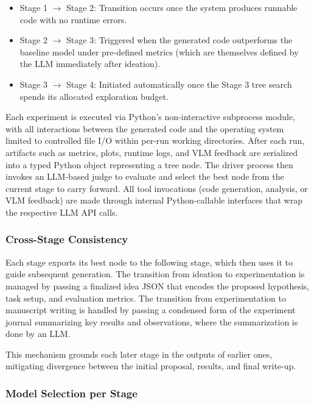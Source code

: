 \begin{appendices}
\begin{itemize}

\item{Stage 1 $\rightarrow$ Stage 2: Transition occurs once the system produces runnable code with no runtime errors.}

\item{Stage 2 $\rightarrow$ Stage 3: Triggered when the generated code outperforms the baseline model under pre-defined metrics (which are themselves defined by the LLM immediately after ideation).}

\item{Stage 3 $\rightarrow$ Stage 4: Initiated automatically once the Stage 3 tree search spends its allocated exploration budget.}

\end{itemize}

Each experiment is executed via Python's non-interactive subprocess module, with all interactions between the generated code and the operating system limited to controlled file I/O within per-run working directories.
After each run, artifacts such as metrics, plots, runtime logs, and VLM feedback are serialized into a typed Python object representing a tree node.
The driver process then invokes an LLM-based judge to evaluate and select the best node from the current stage to carry forward.
All tool invocations (code generation, analysis, or VLM feedback) are made through internal Python-callable interfaces that wrap the respective LLM API calls.

\subsubsection{Cross-Stage Consistency}

Each stage exports its best node to the following stage, which then uses it to guide subsequent generation.
The transition from ideation to experimentation is managed by passing a finalized idea JSON that encodes the proposed hypothesis, task setup, and evaluation metrics.
The transition from experimentation to manuscript writing is handled by passing a condensed form of the experiment journal summarizing key results and observations, where the summarization is done by an LLM.

This mechanism grounds each later stage in the outputs of earlier ones, mitigating divergence between the initial proposal, results, and final write-up.

\subsubsection{Model Selection per Stage}


\end{appendices}
